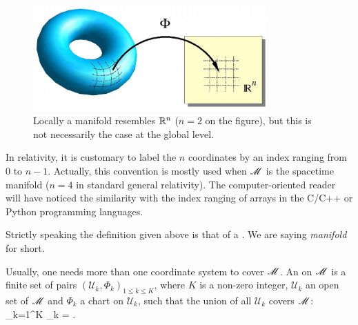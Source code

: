 \begin{figure}
\centerline{\includegraphics[width=0.8\textwidth]{bas_manifold.pdf}}
\caption[]{\label{f:bas:manifold} \footnotesize
Locally a manifold resembles $\mathbb{R}^n$ ($n=2$ on the figure), but this is not necessarily the case at the global level.}
\end{figure}

\begin{remark}
In relativity, it is customary to label the $n$ coordinates by an index
ranging from $0$ to $n-1$. Actually, this convention is mostly used when $\mathscr{M}$ is the spacetime manifold ($n=4$ in standard general relativity). The computer-oriented reader will have noticed the similarity
with the index ranging of arrays in the C/C++ or Python programming languages.
\end{remark}


\begin{remark} \label{r:bas:topol_manif}
Strictly speaking the definition given above is that of a . We are saying \emph{manifold} for short.
\end{remark}


Usually, one needs more than one coordinate system to cover $\mathscr{M}$.
An  on $\mathscr{M}$ is a finite set of pairs
$(\mathcal{U}_k,\Phi_k)_{1\leq k \leq K}$,  where $K$ is a non-zero integer, $\mathcal{U}_k$ an open set of $\mathscr{M}$ and $\Phi_k$ a chart on $\mathcal{U}_k$,
such that the union of all $\mathcal{U}_k$ covers $\mathscr{M}$:
\be
    \bigcup_{k=1}^K _k = \M.
\ee

